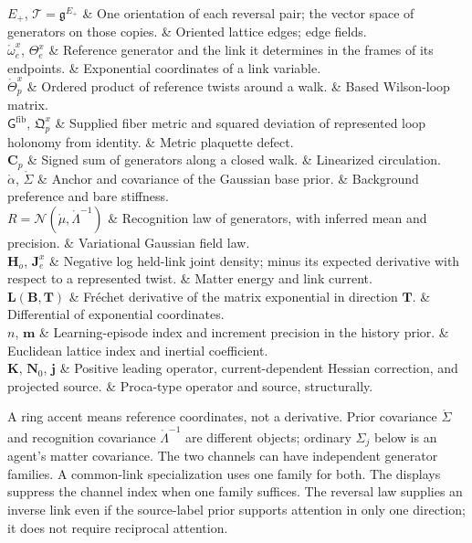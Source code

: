 \begin{decoder}
$E_+$, $\mathscr T=\mathfrak g^{E_+}$ & One orientation of each reversal pair; the vector space of generators on those copies. & Oriented lattice edges; edge fields.\\
$\mathring\omega^x_e$, $\Theta^x_e$ & Reference generator and the link it determines in the frames of its endpoints. & Exponential coordinates of a link variable.\\
$\mathring\Theta^x_p$ & Ordered product of reference twists around a walk. & Based Wilson-loop matrix.\\
$\mathsf G^{\mathrm{fib}}$, $\mathfrak Q^x_p$ & Supplied fiber metric and squared deviation of represented loop holonomy from identity. & Metric plaquette defect.\\
$\mathbf C_p$ & Signed sum of generators along a closed walk. & Linearized circulation.\\
$\mathring\alpha$, $\mathring\Sigma$ & Anchor and covariance of the Gaussian base prior. & Background preference and bare stiffness.\\
$R=\mathcal N(\mathring\mu,\mathring\Lambda^{-1})$ & Recognition law of generators, with inferred mean and precision. & Variational Gaussian field law.\\
$\mathbf H_o$, $\mathbf J^x_e$ & Negative log held-link joint density; minus its expected derivative with respect to a represented twist. & Matter energy and link current.\\
$\mathbf L(\mathbf B,\mathbf T)$ & Fr\'echet derivative of the matrix exponential in direction $\mathbf T$. & Differential of exponential coordinates.\\
$n$, $\mathbf m$ & Learning-episode index and increment precision in the history prior. & Euclidean lattice index and inertial coefficient.\\
$\mathbf K$, $\mathbf N_0$, $\mathbf j$ & Positive leading operator, current-dependent Hessian correction, and projected source. & Proca-type operator and source, structurally.\\
\end{decoder}

A ring accent means reference coordinates, not a derivative. Prior covariance $\mathring\Sigma$
and recognition covariance $\mathring\Lambda^{-1}$ are different objects; ordinary $\Sigma_j$
below is an agent's matter covariance. The two channels can have independent generator families.
A common-link specialization uses one family for both. The displays suppress the channel index
when one family suffices. The reversal law supplies an inverse link even if the source-label
prior supports attention in only one direction; it does not require reciprocal attention.

